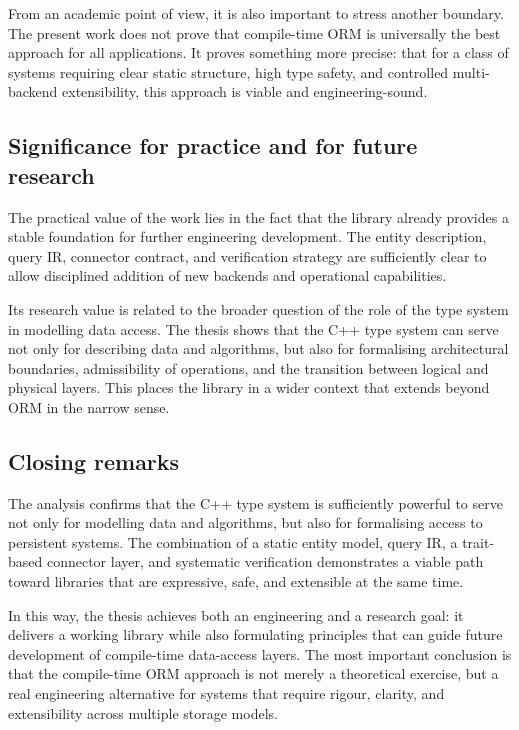 From an academic point of view, it is also important to stress another boundary. The present work does not prove that compile-time ORM is universally the best approach for all applications. It proves something more precise: that for a class of systems requiring clear static structure, high type safety, and controlled multi-backend extensibility, this approach is viable and engineering-sound.

\subsection{Significance for practice and for future research}

The practical value of the work lies in the fact that the library already provides a stable foundation for further engineering development. The entity description, query IR, connector contract, and verification strategy are sufficiently clear to allow disciplined addition of new backends and operational capabilities.

Its research value is related to the broader question of the role of the type system in modelling data access. The thesis shows that the C++ type system can serve not only for describing data and algorithms, but also for formalising architectural boundaries, admissibility of operations, and the transition between logical and physical layers. This places the library in a wider context that extends beyond ORM in the narrow sense.

\subsection{Closing remarks}

The analysis confirms that the C++ type system is sufficiently powerful to serve not only for modelling data and algorithms, but also for formalising access to persistent systems. The combination of a static entity model, query IR, a trait-based connector layer, and systematic verification demonstrates a viable path toward libraries that are expressive, safe, and extensible at the same time.

In this way, the thesis achieves both an engineering and a research goal: it delivers a working library while also formulating principles that can guide future development of compile-time data-access layers. The most important conclusion is that the compile-time ORM approach is not merely a theoretical exercise, but a real engineering alternative for systems that require rigour, clarity, and extensibility across multiple storage models.

